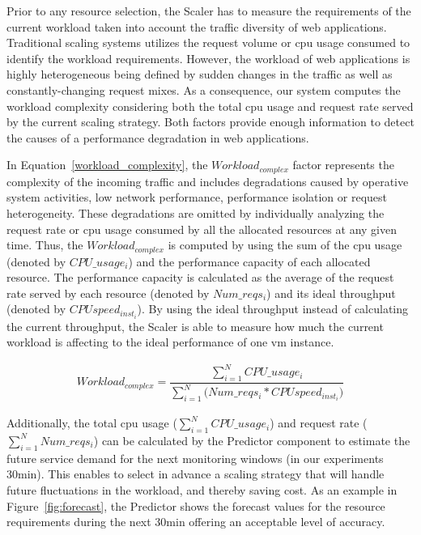 Prior to any resource selection, the Scaler has to measure the requirements of the current workload taken into account the traffic diversity of web applications. Traditional scaling systems utilizes the request volume or cpu usage consumed to identify the workload requirements. However, the workload of web applications is highly heterogeneous being defined by sudden changes in the traffic as well as constantly-changing request mixes. As a consequence, our system computes the workload complexity considering both the total cpu usage and request rate served by the current scaling strategy. Both factors provide enough information to detect the causes of a performance degradation in web applications. 

In Equation~\ref{workload_complexity}, the \emph{$Workload_{complex}$} factor represents the complexity of the incoming traffic and includes degradations caused by operative system activities, low network performance, performance isolation or request heterogeneity. These degradations are omitted by individually analyzing the request rate or cpu usage consumed by all the allocated resources at any given time. Thus, the \emph{$Workload_{complex}$} is computed by using the sum of the cpu usage (denoted by \emph{$CPU\_usage_{i}$}) and the performance capacity of each allocated resource. The performance capacity is calculated as the average of the request rate served by each resource (denoted by $Num\_reqs_{i}$) and its ideal throughput (denoted by $CPU speed_{inst_{i}}$). By using the ideal throughput instead of calculating the current throughput, the Scaler is able to measure how much the current workload is affecting to the ideal performance of one vm instance.

{\scriptsize
\begin{equation}\label{workload_complexity}
\begin{split}
Workload_{complex}  = \dfrac{ \sum_{i=1}^N CPU\_usage_{i}  }  {  \sum_{i=1}^N \bigg(  Num\_reqs_{i}  * CPU speed_{inst_{i}}   \bigg)   }
\end{split}
\end{equation}
}

Additionally, the total cpu usage ($\sum_{i=1}^N CPU\_usage_{i} $) and request rate ($\sum_{i=1}^N  Num\_reqs_{i}$) can be calculated by the Predictor component to estimate the future service demand for the next monitoring windows (in our experiments 30min). This enables to select in advance a scaling strategy that will handle future fluctuations in the workload, and thereby saving cost. As an example in Figure~\ref{fig:forecast}, the Predictor shows the forecast values for the resource requirements during the next 30min offering an acceptable level of accuracy. 

